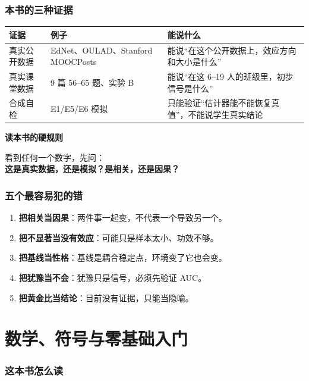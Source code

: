 \documentclass[UTF8,a4paper,11pt]{ctexart}
\newenvironment{explainbox}[1]
{\begin{center}\begin{minipage}{0.94\textwidth}\colorbox{boxbg}{\parbox{0.92\textwidth}{\textbf{#1}\par\vspace{2pt}}}}
{\end{minipage}\end{center}}
\begin{document}
\section{本书的三种证据}

\begin{center}
\begin{longtable}{@{}p{3.0cm}p{4.0cm}p{7.0cm}@{}}
\toprule
\textbf{证据} & \textbf{例子} & \textbf{能说什么} \\
\midrule
真实公开数据 & EdNet、OULAD、Stanford MOOCPosts & 能说“在这个公开数据上，效应方向和大小是什么” \\
真实课堂数据 & 9 篇 56--65 题、实验 B & 能说“在这 6--19 人的班级里，初步信号是什么” \\
合成自检 & E1/E5/E6 模拟 & 只能验证“估计器能不能恢复真值”，不能说学生真实结论 \\
\bottomrule
\end{longtable}
\end{center}

\begin{explainbox}{读本书的硬规则}
看到任何一个数字，先问：\\
\textbf{这是真实数据，还是模拟？是相关，还是因果？}
\end{explainbox}


\section{五个最容易犯的错}

\begin{enumerate}[leftmargin=2em]
\item \textbf{把相关当因果}：两件事一起变，不代表一个导致另一个。
\item \textbf{把不显著当没有效应}：可能只是样本太小、功效不够。
\item \textbf{把基线当性格}：基线是耦合稳定点，环境变了它也会变。
\item \textbf{把犹豫当不会}：犹豫只是信号，必须先验证 AUC。
\item \textbf{把黄金比当结论}：目前没有证据，只能当隐喻。
\end{enumerate}



\part{数学、符号与零基础入门}

\section{这本书怎么读}
\end{document}
